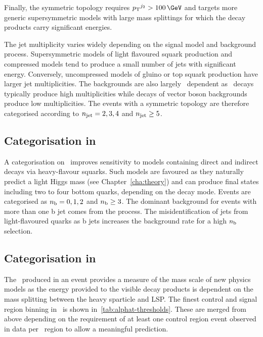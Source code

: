 Finally, the symmetric topology requires $\pt^{j_2} > 100 \,\GeV$ and targets more
generic supersymmetric models with large mass splittings 
for which the decay products carry significant energies.

The jet multiplicity varies widely depending on the signal model and background process. Supersymmetric models of light flavoured squark production and compressed models tend to produce 
a small number of jets with significant energy. Conversely, uncompressed models of gluino or top squark production
have larger jet multiplicities. The backgrounds are also largely \njet~dependent as 
\ttbar~decays typically produce high multiplicities while decays of vector boson backgrounds
produce low multiplicities. The events with a symmetric topology are therefore categorised according
to $n_{\text{jet}} = 2,3,4$ and $n_{\text{jet}} \ge5$.

\subsection{Categorisation in \nb}

A categorisation on \nb~improves sensitivity to models containing direct and indirect
decays via heavy-flavour squarks. Such models are favoured as they naturally
predict a light Higgs mass (see Chapter~\ref{cha:theory}) and can produce
final states including two to four bottom quarks, depending on the decay mode.
Events are categorised as $n_{\mathrm{b}} = 0,1,2$ and $n_{\mathrm{b}} \ge3$. The dominant background for events 
with more than one b jet comes from the \ttbar process. The misidentification of 
jets from light-flavoured quarks as b jets increases the background rate for a high $n_{\mathrm{b}}$ selection.

\subsection{Categorisation in \scalht}

The \scalht~produced in an event provides a measure of the mass scale of 
new physics models as the energy provided to the visible decay products is
dependent on the mass splitting between the heavy sparticle and LSP. 
The finest control and signal region binning in \scalht~is shown in~\ref{tab:alphat-thresholds}. 
These are merged from above depending on the requirement of at least one control region
event observed in data per \scalht~region to allow a meaningful prediction.

